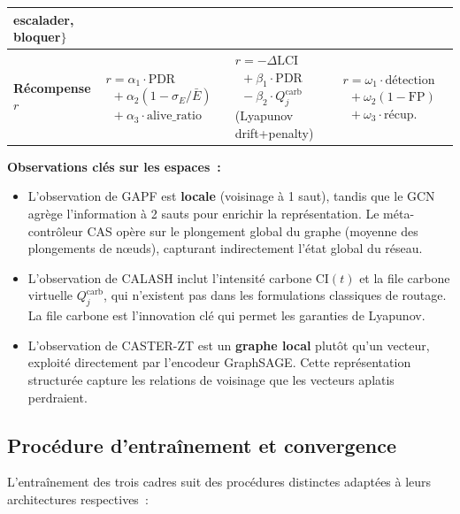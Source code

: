 \begin{table}[htbp]
\begin{tabular}{p{1.7cm}p{3.8cm}p{3.8cm}p{3.8cm}}
  \hphantom{$d_t \in \{$}escalader,\newline
  \hphantom{$d_t \in \{$}bloquer$\}$ \\
\midrule
\textbf{Récompense $r$} &
  $r = \alpha_1 \cdot \text{PDR}$\newline
  $\phantom{r} + \alpha_2 (1 - \sigma_E/\bar{E})$\newline
  $\phantom{r} + \alpha_3 \cdot \text{alive\_ratio}$ &
  $r = -\Delta\text{LCI}$\newline
  $\phantom{r} + \beta_1 \cdot \text{PDR}$\newline
  $\phantom{r} - \beta_2 \cdot Q_j^{\text{carb}}$\newline
  (Lyapunov drift+penalty) &
  $r = \omega_1 \cdot \text{détection}$\newline
  $\phantom{r} + \omega_2 (1 - \text{FP})$\newline
  $\phantom{r} + \omega_3 \cdot \text{récup.}$ \\
\bottomrule
\end{tabular}
\end{table}

\textbf{Observations clés sur les espaces~:}
\begin{itemize}
    \item L'observation de GAPF est \textbf{locale} (voisinage à 1 saut), tandis que le GCN agrège l'information à 2 sauts pour enrichir la représentation. Le méta-contrôleur CAS opère sur le plongement global du graphe (moyenne des plongements de n\oe{}uds), capturant indirectement l'état global du réseau.
    \item L'observation de CALASH inclut l'intensité carbone $\text{CI}(t)$ et la file carbone virtuelle $Q_j^{\text{carb}}$, qui n'existent pas dans les formulations classiques de routage. La file carbone est l'innovation clé qui permet les garanties de Lyapunov.
    \item L'observation de CASTER-ZT est un \textbf{graphe local} plutôt qu'un vecteur, exploité directement par l'encodeur GraphSAGE. Cette représentation structurée capture les relations de voisinage que les vecteurs aplatis perdraient.
\end{itemize}


\subsection{Procédure d'entraînement et convergence}

L'entraînement des trois cadres suit des procédures distinctes adaptées à leurs architectures respectives~:

